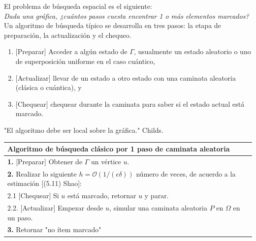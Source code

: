 El problema de búsqueda espacial es el siguiente:\\

\textit{Dada una gráfica, ¿cuántos pasos cuesta encontrar 1 o más elementos  marcados?}\\

\noindent Un algoritmo de búsqueda típico se desarrolla en tres pasos: la etapa de preparación, la actualización y el chequeo.
\begin{enumerate}
    \item $[$Preparar$]$ Acceder a algún estado de $\Gamma$, usualmente un estado aleatorio o uno de superposición uniforme en el caso cuántico,
    \item $[$Actualizar$]$ llevar de un estado a otro estado con una caminata aleatoria (clásica o cuántica), y
    \item $[$Chequear$]$ chequear durante la caminata para saber si el estado actual está marcado.
\end{enumerate}
"El algoritmo debe ser local sobre la gráfica." Childs.

\begin{center}
    \begin{tabular}{l}
    \hline \textbf{Algoritmo de búsqueda clásico} por 1 paso de caminata aleatoria\\\hline 
    \textbf{1.} [Preparar] Obtener de $\Gamma$ un vértice $u$.\\
    \textbf{2.} Realizar lo siguiente $h=\mathcal{O}(1/(\epsilon \delta))$ número de veces, de acuerdo a la estimación [(5.11) Shao]:\\
    2.1 [Chequear] Si $u$ está marcado, retornar $u$ y  parar.\\
    2.2. [Actualizar] Empezar desde $u$, simular una caminata aleatoria $P$ en $\Omega$ en un paso.\\
    \textbf{3.} Retornar "no ítem marcado"\\\hline
    \end{tabular}{}
\end{center}{}

